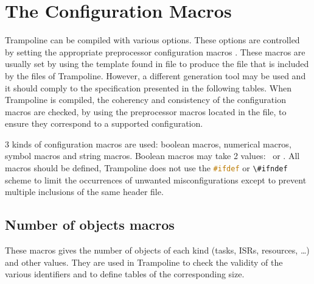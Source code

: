 \section{The Configuration Macros}
\label{sec:configmacros}

Trampoline can be compiled with various options. These options are controlled by setting the appropriate preprocessor configuration macros%
.
These macros are usually set by \goil
using the template found in  file to produce the  file that is included by the files of Trampoline. However, a different generation tool may be used and it should comply to the specification presented in the following tables. When Trampoline is compiled, the coherency and consistency of the configuration macros are checked, by using the preprocessor macros located in the  file, to ensure they correspond to a supported configuration.

3 kinds of configuration macros are used: boolean macros, numerical macros, symbol macros and string macros. Boolean macros may take 2 values: \YES\ or \NO. All macros should be defined, Trampoline does not use the \lstinline[language=C]{#ifdef} or \lstinline[language=C]{\#ifndef} scheme to limit the occurrences of unwanted misconfigurations except to prevent multiple inclusions of the same header file.

\subsection{Number of objects macros}

These macros gives the number of objects of each kind (tasks, ISRs, resources, \ldots) and other values. They are used in Trampoline to check the validity of the various identifiers and to define tables of the corresponding size.
 
